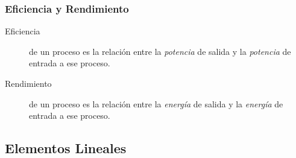 \documentclass[serif, xcolor=dvipsnames]{beamer}
\begin{document}
\begin{frame}
  \frametitle{Eficiencia y Rendimiento}
  \begin{description}
  \item [{Eficiencia}] de un proceso es la relación entre la
    \emph{potencia} de salida y la \emph{potencia} de entrada a ese
    proceso.
  \item [{Rendimiento}] de un proceso es la relación entre la
    \emph{energía} de salida y la \emph{energía} de entrada a ese
    proceso.
  \end{description}

\end{frame}


\subsection{Elementos Lineales}
\end{document}
